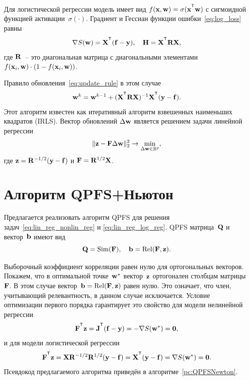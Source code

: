 Для логистической регрессии модель имеет вид $f(\bx , \bw) = \sigma(\bx^{\T} \bw)$ с сигмоидной функцией активации~$\sigma(\cdot)$.
Градиент и Гессиан функции ошибки~\eqref{eq:log_loss} равны
\begin{equation}
\nabla S(\bw) = \bX^{\T} (\mathbf{f} - \by), \quad \bH = \bX^{\T} \bR \bX,
\label{eq:log_reg_deriv}
\end{equation}
где $\mathbf{R}$~-- это диагональная матрица с диагональными элементами $f(\mathbf{x}_i , \mathbf{w}) \cdot (1 - f(\mathbf{x}_i , \mathbf{w}))$.

Правило обновления~\eqref{eq:update_rule} в этом случае
\[
\bw^k = \bw^{k - 1} + (\bX^{\T} \bR \bX)^{-1} \bX^{\T} (\by - \mathbf{f}).
\]
Этот алгоритм известен как итеративный алгоритм взвешенных наименьших квадратов (IRLS). Вектор обновлений $\Delta \mathbf{w}$ является решением задачи линейной регрессии
\begin{equation}
\| \mathbf{z} - \mathbf{F} \Delta \mathbf{w} \|_2^2 \rightarrow \min_{\Delta \mathbf{w} \in \mathbb{R}^{p}},
\label{eq:lin_reg_log_reg}
\end{equation}
где $\mathbf{z} = \mathbf{R}^{-1/2} (\mathbf{y} - \mathbf{f})$ и $\mathbf{F} = \mathbf{R}^{1/2}\mathbf{X}$.

\section{Алгоритм QPFS+Ньютон}

Предлагается реализовать алгоритм QPFS для решения задач~\eqref{eq:lin_reg_nonlin_reg} и \eqref{eq:lin_reg_log_reg}. 
QPFS матрица~$\mathbf{Q}$ и вектор~$\mathbf{b}$ имеют вид
\[
\mathbf{Q} = \text{Sim} (\mathbf{F}), \quad \mathbf{b} = \text{Rel} (\mathbf{F}, \mathbf{z}).
\]

Выборочный коэффициент корреляции равен нулю для ортогональных векторов.
Покажем, что в оптимальной точке~$\mathbf{w}^*$ вектор~$\mathbf{z}$ ортогонален столбцам матрицы~$\mathbf{F}$. 
В этом случае вектор~$\mathbf{b} = \text{Rel} (\mathbf{F}, \mathbf{z})$ равен нулю. Это означает, что член, учитывающий релевантность, в данном случае исключается.
Условие оптимизации первого порядка гарантирует это свойство для модели нелинейной регрессии
\[
\bF^{\T} \bz = \bJ^{\T} (\mathbf{f} - \by) = - \nabla S(\bw^*) = \boldsymbol{0},
\]
и для модели логистической регрессии
\[
\bF^{\T} \bz = \bX \bR^{-1/2} \bR^{1/2} (\by - \mathbf{f}) = \bX^{\T} (\by - \mathbf{f}) = \nabla S(\bw^*) = \boldsymbol{0}.
\]
Псевдокод предлагаемого алгоритма приведён в алгоритме~\ref{pc:QPFSNewton}.


